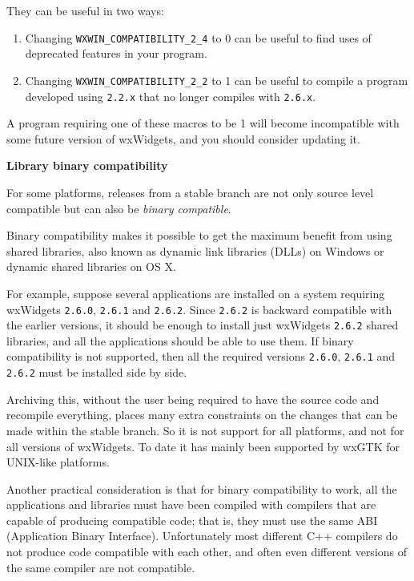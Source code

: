 They can be useful in two ways:

\begin{enumerate}
\item Changing {\tt WXWIN\_COMPATIBILITY\_2\_4} to 0 can be useful to
find uses of deprecated features in your program.
\item Changing {\tt WXWIN\_COMPATIBILITY\_2\_2} to 1 can be useful to
compile a program developed using {\tt 2.2.x} that no longer compiles
with {\tt 2.6.x}.
\end{enumerate}

A program requiring one of these macros to be 1 will become
incompatible with some future version of wxWidgets, and you should consider
updating it.

{\large {\bf Library binary compatibility}}\label{libbincompatibility}

For some platforms, releases from a stable branch are not only source level
compatible but can also be {\em binary compatible}.

Binary compatibility makes it possible to get the maximum benefit from
using shared libraries, also known as dynamic link libraries (DLLs) on
Windows or dynamic shared libraries on OS X.

For example, suppose several applications are installed on a system requiring
wxWidgets {\tt 2.6.0}, {\tt 2.6.1} and {\tt 2.6.2}. Since {\tt 2.6.2} is
backward compatible with the earlier versions, it should be enough to
install just wxWidgets {\tt 2.6.2} shared libraries, and all the applications
should be able to use them. If binary compatibility is not supported, then all
the required versions {\tt 2.6.0}, {\tt 2.6.1} and {\tt 2.6.2} must be
installed side by side.

Archiving this, without the user being required to have the source code
and recompile everything, places many extra constraints on the changes
that can be made within the stable branch. So it is not support for all
platforms, and not for all versions of wxWidgets. To date it has mainly
been supported by wxGTK for UNIX-like platforms.

Another practical consideration is that for binary compatibility to work,
all the applications and libraries must have been compiled with compilers
that are capable of producing compatible code; that is, they must use the
same ABI (Application Binary Interface). Unfortunately most different C++
compilers do not produce code compatible with each other, and often even
different versions of the same compiler are not compatible.


